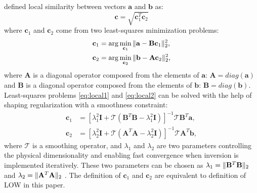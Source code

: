\cite{fomel2007localattr} defined local similarity between vectors $\mathbf{a}$ and $\mathbf{b}$ as:
\begin{equation}
\label{eq:local}
\mathbf{c}=\sqrt{\mathbf{c}_1^T\mathbf{c}_2}
\end{equation}
where $\mathbf{c}_1$ and $\mathbf{c}_2$ come from two least-squares minimization problems:
\begin{align}
\label{eq:local1}
\mathbf{c}_1 &=\arg\min_{\mathbf{c}_1}\Arrowvert \mathbf{a}-\mathbf{B}\mathbf{c}_1 \Arrowvert_2^2, \\
\label{eq:local2}
\mathbf{c}_2 &=\arg\min_{\mathbf{c}_2}\Arrowvert \mathbf{b}-\mathbf{A}\mathbf{c}_2 \Arrowvert_2^2,
\end{align}
where $\mathbf{A}$ is a diagonal operator composed from the elements of $\mathbf{a}$: $\mathbf{A}=diag(\mathbf{a})$ and $\mathbf{B}$ is a diagonal operator composed from the elements of $\mathbf{b}$: $\mathbf{B}=diag(\mathbf{b})$.
Least-squares problems \ref{eq:local1} and \ref{eq:local2} can be solved with the help of shaping regularization with a smoothness constraint:
\begin{align}
\label{eq:local3}
\mathbf{c}_1 &= [\lambda_1^2\mathbf{I} + \mathcal{T}(\mathbf{B}^T\mathbf{B}-\lambda_1^2\mathbf{I})]^{-1}\mathcal{T}\mathbf{B}^T\mathbf{a},\\
\label{eq:local4}
\mathbf{c}_2 &= [\lambda_2^2\mathbf{I} + \mathcal{T}(\mathbf{A}^T\mathbf{A}-\lambda_2^2\mathbf{I})]^{-1}\mathcal{T}\mathbf{A}^T\mathbf{b},
\end{align}
where $\mathbf{\mathcal{T}}$ is a smoothing operator, and $\lambda_1$ and $\lambda_2$ are two parameters controlling the physical dimensionality and enabling fast convergence when inversion is implemented iteratively. These two parameters can be chosen as $\lambda_1  = \Arrowvert\mathbf{B}^T\mathbf{B}\Arrowvert_2$ and $\lambda_2  = \Arrowvert\mathbf{A}^T\mathbf{A}\Arrowvert_2$ \cite[]{fomel2007localattr}. The definition of $\mathbf{c}_1$ and $\mathbf{c}_2$ are equivalent to definition of LOW in this paper.




